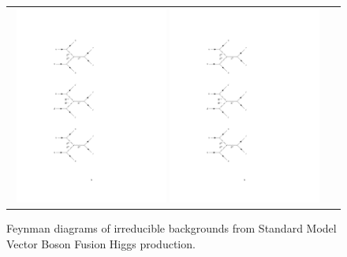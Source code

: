 \begin{figure}[tbh!]
	\centering
	\begin{tabular}{cc}
		\includegraphics[width=0.48\textwidth]{diagrams/pics/background_HZ0.pdf}
		\includegraphics[width=0.48\textwidth]{diagrams/pics/background_HW.pdf} 		
	\end{tabular}
	\caption{Feynman diagrams of irreducible backgrounds from Standard Model Vector Boson Fusion Higgs production. }
	\label{fig:background_SMVBFH}
\end{figure}

